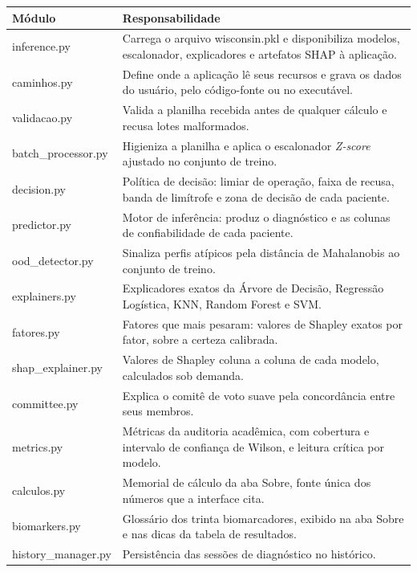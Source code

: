 \documentclass[
    12pt
    ,oneside
    ,a4paper
    ,chapter=TITLE
    ,section=TITLE
    ,sumario=abnt-6027-2012
    ,english,brazil]{abntex2} %
\begin{document}
\begin{quadro}[htbp]
    \centering
    \begin{tabular}{|l|p{11.2cm}|}
        \hline
        \textbf{Módulo} & \textbf{Responsabilidade} \\
        \hline
        inference.py & Carrega o arquivo wisconsin.pkl e disponibiliza modelos, escalonador,
                       explicadores e artefatos SHAP à aplicação. \\ \hline
        caminhos.py & Define onde a aplicação lê seus recursos e grava os dados do usuário,
                      pelo código-fonte ou no executável. \\ \hline
        validacao.py & Valida a planilha recebida antes de qualquer cálculo e recusa lotes
                       malformados. \\ \hline
        batch\_processor.py & Higieniza a planilha e aplica o escalonador
                              \textit{Z-score} ajustado no conjunto de treino. \\ \hline
        decision.py & Política de decisão: limiar de operação, faixa de recusa, banda de
                      limítrofe e zona de decisão de cada paciente. \\ \hline
        predictor.py & Motor de inferência: produz o diagnóstico e as colunas de
                       confiabilidade de cada paciente. \\ \hline
        ood\_detector.py & Sinaliza perfis atípicos pela distância de Mahalanobis ao
                           conjunto de treino. \\ \hline
        explainers.py & Explicadores exatos da Árvore de Decisão, Regressão Logística,
                        KNN, Random Forest e SVM. \\ \hline
        fatores.py & Fatores que mais pesaram: valores de Shapley exatos por fator, sobre
                     a certeza calibrada. \\ \hline
        shap\_explainer.py & Valores de Shapley coluna a coluna de cada modelo, calculados
                             sob demanda. \\ \hline
        committee.py & Explica o comitê de voto suave pela concordância entre seus
                       membros. \\ \hline
        metrics.py & Métricas da auditoria acadêmica, com cobertura e intervalo de
                     confiança de Wilson, e leitura crítica por modelo. \\ \hline
        calculos.py & Memorial de cálculo da aba Sobre, fonte única dos números que a
                      interface cita. \\ \hline
        biomarkers.py & Glossário dos trinta biomarcadores, exibido na aba Sobre e nas
                        dicas da tabela de resultados. \\ \hline
        history\_manager.py & Persistência das sessões de diagnóstico no histórico. \\ \hline
    \end{tabular}
    \vspace{0.2cm}
    \fonteautor
\end{quadro}
\end{document}
